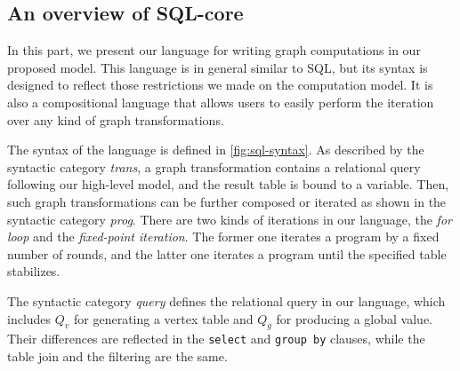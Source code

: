 \documentclass{sokendai_thesis} %
\begin{document}
\subsection{An overview of SQL-core}

In this part, we present our language for writing graph computations in our proposed model.
This language is in general similar to SQL, but its syntax is designed to reflect those restrictions we made on the computation model.
It is also a compositional language that allows users to easily perform the iteration over any kind of graph transformations.


The syntax of the language is defined in \autoref{fig:sql-syntax}.
As described by the syntactic category \textit{trans}, a graph transformation contains a relational query following our high-level model, and the result table is bound to a variable.
Then, such graph transformations can be further composed or iterated %
as shown in the syntactic category \textit{prog}.
There are two kinds of iterations in our language, the \textit{for loop} and the \textit{fixed-point iteration}.
The former one iterates a program by a fixed number of rounds, and the latter one iterates a program until the specified table stabilizes.

The syntactic category \textit{query} defines the relational query in our language, which includes $Q_v$ for generating a vertex table and $Q_g$ for producing a global value.
Their differences are reflected in the \texttt{select} and \texttt{group by} clauses, while the table join and the filtering are the same.
\end{document}

